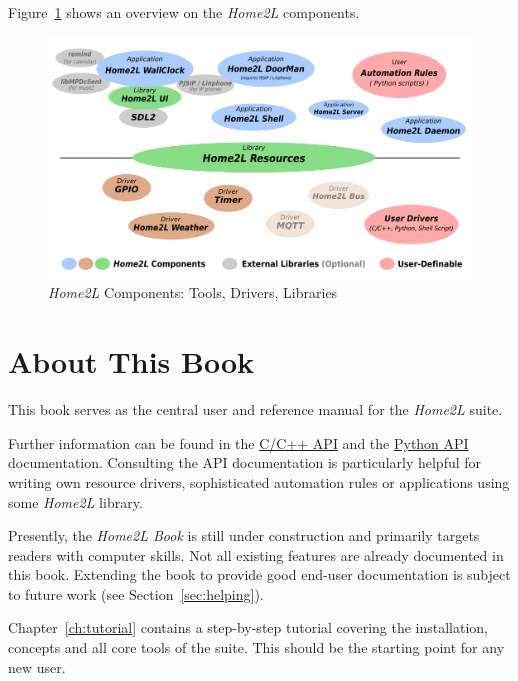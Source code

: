 \documentclass[12pt,english,parskip=half]{scrreprt}
\newcommand{\figfile}[2]{#2}             %
\newcommand{\figfile}[2]{\href{#1}{#2}}  %
\newcommand{\projecturl}{}
\newcommand{\docref}[2]{\href{\projecturl#1}{#2}}
\newcommand{\refapipython}{\docref{home2l-api_python/index.html}{Python API}}
\newcommand{\refapic}{\docref{home2l-api_c/index.html}{C/C++ API}}
\begin{document}
Figure~\ref{fig:home2l-components} shows an overview on the \emph{Home2L} components.

\begin{figure}[ht]
  \centering
  \figfile{figs/home2l-components.svg}{
    \includegraphics[width=0.9\linewidth,keepaspectratio]{figs/home2l-components}   %
  }
  \caption[l]{\emph{Home2L} Components:
    \textcolor[rgb]{0.2,0.3,1.0}{Tools},
    \textcolor[rgb]{0.5,0.25,0}{Drivers},
    \textcolor[rgb]{0,0.5,0}{Libraries}
  }
  \label{fig:home2l-components}
\end{figure}




\section{About This Book}
\label{sec:intro-about}

This book serves as the central user and reference manual for the \emph{Home2L} suite.

Further information can be found in the \refapic{} and the \refapipython{} documentation.
Consulting the API documentation is particularly helpful for writing own resource drivers,
sophisticated automation rules or applications using some \emph{Home2L} library.

Presently, the \textit{Home2L Book} is still under construction and primarily targets readers
with computer skills. Not all existing features are already documented in this book.
Extending the book to provide good end-user documentation is subject to future work
(see Section~\ref{sec:helping}).

Chapter~\ref{ch:tutorial} contains a step-by-step tutorial covering the installation,
concepts and all core tools of the suite. This should be the starting point for any new user.
\end{document}

